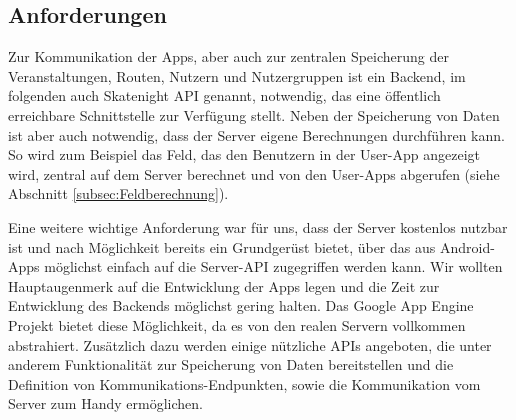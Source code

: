 \subsection{Anforderungen}
Zur Kommunikation der Apps, aber auch zur zentralen Speicherung der Veranstaltungen, Routen, Nutzern und Nutzergruppen ist ein Backend, im folgenden auch Skatenight API genannt, notwendig, das eine öffentlich erreichbare Schnittstelle zur Verfügung stellt. Neben der Speicherung von Daten ist aber auch notwendig, dass der Server eigene Berechnungen durchführen kann. So wird zum Beispiel das Feld, das den Benutzern in der User-App angezeigt wird, zentral auf dem Server berechnet und von den User-Apps abgerufen (siehe Abschnitt \ref{subsec:Feldberechnung}).

Eine weitere wichtige Anforderung war für uns, dass der Server kostenlos nutzbar ist und nach Möglichkeit bereits ein Grundgerüst bietet, über das aus Android-Apps möglichst einfach auf die Server-API zugegriffen werden kann. Wir wollten Hauptaugenmerk auf die Entwicklung der Apps legen und die Zeit zur Entwicklung des Backends möglichst gering halten. Das Google App Engine Projekt bietet diese Möglichkeit, da es von den realen Servern vollkommen abstrahiert. Zusätzlich dazu werden einige nützliche APIs angeboten, die unter anderem Funktionalität zur Speicherung von Daten bereitstellen und die Definition von Kommunikations-Endpunkten, sowie die Kommunikation vom Server zum Handy ermöglichen.

